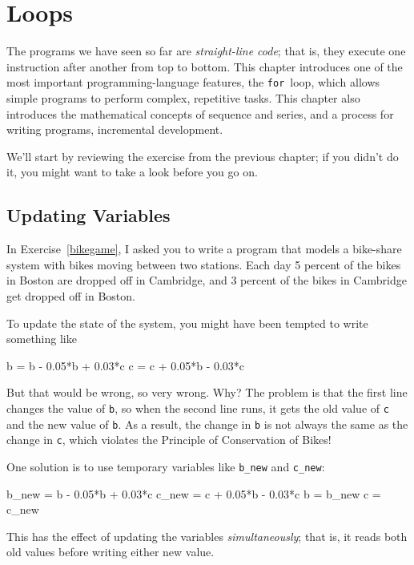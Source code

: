
\chapter{Loops}
\label{loops}


The programs we have seen so far are \emph{straight-line code}; that is, they execute one instruction after another from top to bottom.
This chapter introduces one of the most important programming-language features, the \lstinline{for}~loop, which allows simple programs to perform complex, repetitive tasks. This chapter also introduces the mathematical concepts of sequence and series, and a process for writing programs, incremental development.

We'll start by reviewing the exercise from the previous chapter; if you didn't do it, you might want to take a look before you go on.

\section{Updating Variables}

In Exercise~\ref{bikegame}, I asked you to write a program that models a bike-share system with bikes moving between two stations.
Each day 5 percent of the bikes in Boston are dropped off in Cambridge, and 3 percent of the bikes
in Cambridge get dropped off in Boston.

To update the state of the system, you might have been tempted to write something
like


\begin{code}
b = b - 0.05*b + 0.03*c
c = c + 0.05*b - 0.03*c
\end{code}

But that would be wrong, so very wrong.  Why?  The problem is that
the first line changes the value of \lstinline{b}, so when the second line
runs, it gets the old value of \lstinline{c} and the new value of \lstinline{b}.
As a result, the change in \lstinline{b} is not always the same as the
change in \lstinline{c}, which violates the Principle of Conservation
of Bikes!

One solution is to use temporary variables like \lstinline{b_new} and \lstinline{c_new}:

\begin{code}
b_new = b - 0.05*b + 0.03*c
c_new = c + 0.05*b - 0.03*c
b = b_new
c = c_new
\end{code}

This has the effect of updating the variables \emph{simultaneously}; that
is, it reads both old values before writing either new value.

